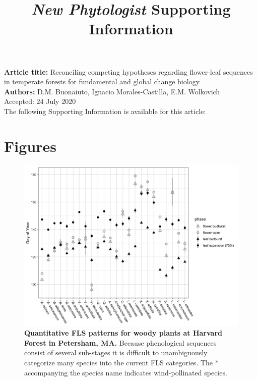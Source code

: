\documentclass[11pt]{article}
\title{\textit{New Phytologist} Supporting Information}
\date{}
\begin{document}
\maketitle

\noindent \textbf{Article title:} Reconciling competing hypotheses regarding flower-leaf sequences in temperate forests for fundamental and global change biology\\
\noindent \textbf{Authors:} D.M. Buonaiuto, Ignacio Morales-Castilla, E.M. Wolkovich\\
\noindent Accepted: 24 July 2020\\

\noindent The following Supporting Information is available for this article:\\

\pagebreak[4]

\section*{Figures}
\begin{figure}[H]
\centering
\includegraphics[width=\textwidth]{..//..//HarvardForest/HFmeans_expanded.jpeg} 
\caption{\textbf{Quantitative FLS patterns for woody plants at Harvard Forest in Petersham, MA.} Because phenological sequences consist of several sub-stages it is difficult to unambiguously categorize many species into the current FLS categories. The * accompanying the species name indicates wind-pollinated species.}
\label{fig:HFmeans}
\end{figure}
\end{document}
